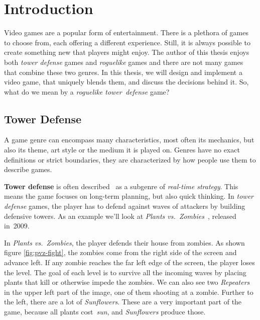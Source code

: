 \chapter{Introduction}

Video games are a popular form of entertainment.
There is a plethora of games to choose from, each offering a different experience.
Still, it is always possible to create something new that players might enjoy.
The author of this thesis enjoys both \emph{tower defense} games and \emph{roguelike} games and there are not many games that combine these two genres.
In this thesis, we will design and implement a video game, that uniquely blends them, and discuss the decisions behind it.
So, what do we mean by a \emph{roguelike tower~defense} game?

\section{Tower Defense}

A game genre can encompass many characteristics, most often its mechanics, but also its theme, art style or the medium it is played on.
Genres have no exact definitions or strict boundaries, they are characterized by how people use them to describe games.

\textbf{Tower defense} is often described~\cite{TDWiki}\cite{CITD} as a subgenre of \emph{real-time strategy}.
This means the game focuses on long-term planning, but also quick thinking.
In \emph{tower defense} games, the player has to defend against waves of attackers by building defensive towers.
As an example we'll look at \emph{Plants vs.\ Zombies}~\cite{PvZWeb}, released in~2009.

In \emph{Plants vs.\ Zombies}, the player defends their house from zombies.
As shown figure \ref{fig:pvz-fight}, the zombies come from the right side of the screen and advance left.
If any zombie reaches the far left edge of the screen, the player loses the level.
The goal of each level is to survive all the incoming waves by placing plants that kill or otherwise impede the zombies.
We can also see two \emph{Repeaters} in the upper left part of the image, one of them shooting at a zombie.
Further to the left, there are a lot of \emph{Sunflowers}.
These are a very important part of the game, because all plants cost~\emph{sun}, and \emph{Sunflowers} produce those.

